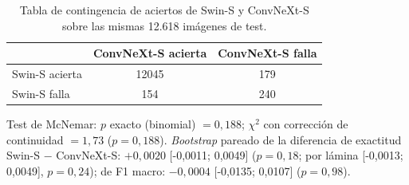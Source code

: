 \begin{table}
\centering
\small
\caption{Tabla de contingencia de aciertos de Swin-S y ConvNeXt-S sobre las mismas 12.618 imágenes de test.}
\label{tab:mcnemar}
\begin{tabular*}{\linewidth}{@{\extracolsep{\fill}}lcc}
\toprule
& ConvNeXt-S acierta & ConvNeXt-S falla \\
\midrule
Swin-S acierta & \num{12045} & \num{179} \\
Swin-S falla & \num{154} & \num{240} \\
\bottomrule
\end{tabular*}

\smallskip
\parbox{\linewidth}{\scriptsize Test de McNemar: $p$ exacto (binomial) $= 0{,}188$; $\chi^2$ con corrección de continuidad $= 1{,}73$ ($p = 0{,}188$). \emph{Bootstrap} pareado de la diferencia de exactitud Swin-S $-$ ConvNeXt-S: $+0{,}0020$ [-0{,}0011; 0{,}0049] ($p = 0{,}18$; por lámina [-0{,}0013; 0{,}0049], $p = 0{,}24$); de F1 macro: $-0{,}0004$ [-0{,}0135; 0{,}0107] ($p = 0{,}98$).}
\end{table}
